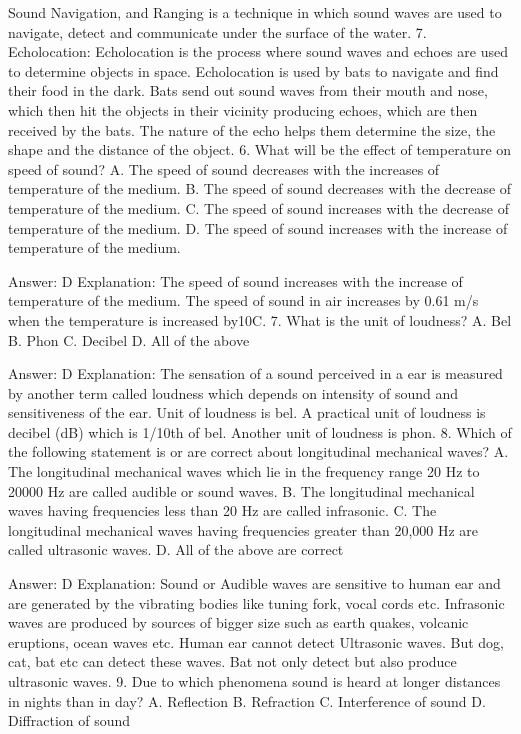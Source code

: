 Sound Navigation, and Ranging is a technique in which sound waves are used to navigate, detect and communicate under the surface of the water. 7. Echolocation: Echolocation is the process where sound waves and echoes are used to determine objects in space. Echolocation is used by bats to navigate and find their food in the dark. Bats send out sound waves from their mouth and nose, which then hit the objects in their vicinity producing echoes, which are then received by the bats. The nature of the echo helps them determine the size, the shape and the distance of the object. 6. What will be the effect of temperature on speed of sound? A. The speed of sound decreases with the increases of temperature of the medium. B. The speed of sound decreases with the decrease of temperature of the medium. C. The speed of sound increases with the decrease of temperature of the medium. D. The speed of sound increases with the increase of temperature of the medium. 

Answer: D
Explanation: The speed of sound increases with the increase of temperature of the medium. The speed of sound in air increases by 0.61 m/s when the temperature is increased by10C. 7. What is the unit of loudness? A. Bel B. Phon C. Decibel D. All of the above 

Answer: D
Explanation: The sensation of a sound perceived in a ear is measured by another term called loudness which depends on intensity of sound and sensitiveness of the ear. Unit of loudness is bel. A practical unit of loudness is decibel (dB) which is 1/10th of bel. Another unit of loudness is phon. 8. Which of the following statement is or are correct about longitudinal mechanical waves? A. The longitudinal mechanical waves which lie in the frequency range 20 Hz to 20000 Hz are called audible or sound waves. B. The longitudinal mechanical waves having frequencies less than 20 Hz are called infrasonic. C. The longitudinal mechanical waves having frequencies greater than 20,000 Hz are called ultrasonic waves. D. All of the above are correct 

Answer: D
Explanation: Sound or Audible waves are sensitive to human ear and are generated by the vibrating bodies like tuning fork, vocal cords etc. Infrasonic waves are produced by sources of bigger size such as earth quakes, volcanic eruptions, ocean waves etc. Human ear cannot detect Ultrasonic waves. But dog, cat, bat etc can detect these waves. Bat not only detect but also produce ultrasonic waves. 9. Due to which phenomena sound is heard at longer distances in nights than in day? A. Reflection B. Refraction C. Interference of sound D. Diffraction of sound 

